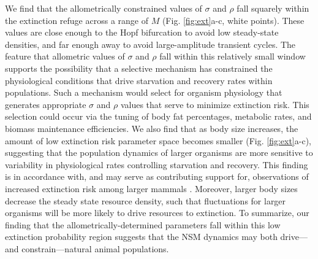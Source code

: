 \documentclass[twocolumn,preprintnumbers,amsmath,amssymb,superscriptaddress]{revtex4}
\begin{document}
We find that the allometrically constrained values of $\sigma$ and $\rho$ fall squarely within the extinction refuge across a range of $M$ (Fig. \ref{fig:ext}a-c, white points).
These values are close enough to the Hopf bifurcation to avoid low steady-state densities, and far enough away to avoid large-amplitude transient cycles.
The feature that allometric values of $\sigma$ and $\rho$ fall within this relatively small window supports the possibility that a selective mechanism has constrained the physiological conditions that drive starvation and recovery rates within populations.
Such a mechanism would select for organism physiology that generates appropriate $\sigma$ and $\rho$ values that serve to minimize extinction risk.
This selection could occur via the tuning of body fat percentages, metabolic rates, and biomass maintenance efficiencies.
We also find that as body size increases, the amount of low extinction risk parameter space becomes smaller (Fig. \ref{fig:ext}a-c), suggesting that the population dynamics of larger organisms are more sensitive to variability in physiological rates controlling starvation and recovery.
This finding is in accordance with, and may serve as contributing support for, observations of increased extinction risk among larger mammals \cite{Liow:2008jx}.
Moreover, larger body sizes decrease the steady state resource density, such that fluctuations for larger organisms will be more likely to drive resources to extinction.
To summarize, our finding that the allometrically-determined parameters fall within this low extinction probability region suggests that the NSM dynamics may both drive---and constrain---natural animal populations.\\





\end{document}
